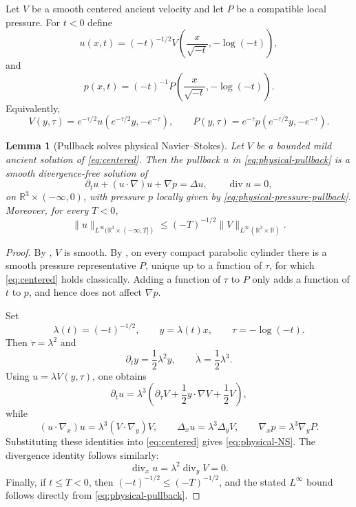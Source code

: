 \documentclass[11pt]{amsart}
\theoremstyle{plain}
\newtheorem{lemma}[theorem]{Lemma}
\theoremstyle{definition}
\theoremstyle{remark}
\numberwithin{equation}{section}
\newcommand{\R}{\mathbb R}
\newcommand{\divergence}{\operatorname{div}}
\begin{document}
Let \(V\) be a smooth centered ancient velocity and let \(P\) be a compatible
local pressure.  For \(t<0\) define
\begin{equation}\label{eq:physical-pullback}
   u(x,t)=(-t)^{-1/2}
   V\left(\frac{x}{\sqrt{-t}},-\log(-t)\right),
\end{equation}
and
\begin{equation}\label{eq:physical-pressure-pullback}
   p(x,t)=(-t)^{-1}
   P\left(\frac{x}{\sqrt{-t}},-\log(-t)\right).
\end{equation}
Equivalently,
\[
   V(y,\tau)=e^{-\tau/2}u(e^{-\tau/2}y,-e^{-\tau}),
   \qquad
   P(y,\tau)=e^{-\tau}p(e^{-\tau/2}y,-e^{-\tau}).
\]

\begin{lemma}[Pullback solves physical Navier--Stokes]
\label{lem:physical-pullback}
Let \(V\) be a bounded mild ancient solution of \eqref{eq:centered}.  Then
the pullback \(u\) in \eqref{eq:physical-pullback} is a smooth divergence-free
solution of
\begin{equation}\label{eq:physical-NS}
   \partial_tu+(u\cdot\nabla)u+\nabla p=\Delta u,
   \qquad \divergence u=0,
\end{equation}
on \(\R^3\times(-\infty,0)\), with pressure \(p\) locally given by
\eqref{eq:physical-pressure-pullback}.  Moreover, for every \(T<0\),
\[
   \|u\|_{L^\infty(\R^3\times(-\infty,T])}
   \le
   (-T)^{-1/2}\|V\|_{L^\infty(\R^3\times\R)}.
\]
\end{lemma}

\begin{proof}
By , \(V\) is smooth.  By
, on every compact parabolic cylinder there is a
smooth pressure representative \(P\), unique up to a function of \(\tau\), for
which \eqref{eq:centered} holds classically.  Adding a function of \(\tau\) to
\(P\) only adds a function of \(t\) to \(p\), and hence does not affect
\(\nabla p\).

Set
\[
   \lambda(t)=(-t)^{-1/2},\qquad
   y=\lambda(t)x,\qquad
   \tau=-\log(-t).
\]
Then \(\dot \tau=\lambda^2\) and
\[
   \partial_t y=\frac12\lambda^2 y,
   \qquad
   \dot\lambda=\frac12\lambda^3 .
\]
Using \(u=\lambda V(y,\tau)\), one obtains
\[
   \partial_tu
   =
   \lambda^3
   \left(
      \partial_\tau V+\frac12y\cdot\nabla V+\frac12V
   \right),
\]
while
\[
   (u\cdot\nabla_x)u=\lambda^3(V\cdot\nabla_y)V,
   \qquad
   \Delta_xu=\lambda^3\Delta_yV,
   \qquad
   \nabla_xp=\lambda^3\nabla_yP .
\]
Substituting these identities into \eqref{eq:centered} gives
\eqref{eq:physical-NS}.  The divergence identity follows similarly:
\[
   \divergence_xu=\lambda^2\divergence_yV=0.
\]
Finally, if \(t\le T<0\), then \((-t)^{-1/2}\le(-T)^{-1/2}\), and the stated
\(L^\infty\) bound follows directly from \eqref{eq:physical-pullback}.
\end{proof}
\end{document}
